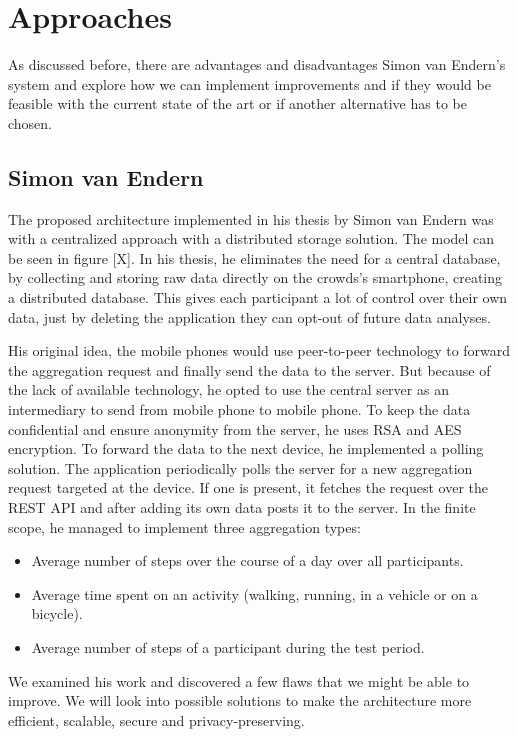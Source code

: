 \section{Approaches}
As discussed before, there are advantages and disadvantages Simon van Endern's system and explore how we can implement improvements and if they would be feasible with the current state of the art or if another alternative has to be chosen.

\subsection{Simon van Endern}
The proposed architecture implemented in his thesis by Simon van Endern was with a centralized approach with a distributed storage solution. The model can be seen in figure [X].
In his thesis, he eliminates the need for a central database, by collecting and storing raw data directly on the crowds's smartphone, creating a distributed database. This gives each participant a lot of control over their own data, just by deleting the application they can opt-out of future data analyses.

His original idea, the mobile phones would use peer-to-peer technology to forward the aggregation request and finally send the data to the server. But because of the lack of available technology, he opted to use the central server as an intermediary to send from mobile phone to mobile phone. To keep the data confidential and ensure anonymity from the server, he uses RSA and AES encryption. To forward the data to the next device, he implemented a polling solution. The application periodically polls the server for a new aggregation request targeted at the device. If one is present, it fetches the request over the REST API and after adding its own data posts it to the server.
In the finite scope, he managed to implement three aggregation types:

\begin{itemize}
	\item Average number of steps over the course of a day over all participants. 
	\item Average time spent on an activity (walking, running, in a vehicle or on a bicycle).
	\item Average number of steps of a participant during the test period. 
\end{itemize}

We examined his work and discovered a few flaws that we might be able to improve. We will look into possible solutions to make the architecture more efficient, scalable, secure and privacy-preserving. 

